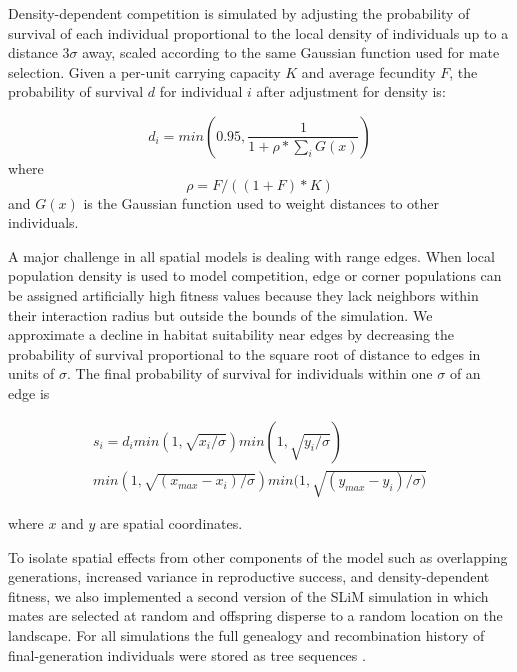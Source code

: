 \documentclass[9pt,twocolumn,twoside,lineno]{gsajnl}
\begin{document}
Density-dependent competition is simulated by adjusting the probability of survival of each individual proportional to the local density of individuals up to a distance $3\sigma$ away, scaled according to the same Gaussian function used for mate selection. Given a per-unit carrying capacity $K$ and average fecundity $F$, the probability of survival $d$ for individual $i$ after adjustment for density is:

\begin{equation}
    d_{i}=min(0.95,\frac{1}{1+\rho*\sum_{i}{G(x)}})
\end{equation}
where 
\begin{equation}
    \rho = F/((1+F)*K)
\end{equation} 
and $G(x)$ is the Gaussian function used to weight distances to other individuals. 

A major challenge in all spatial models is dealing with range edges. When local population density is used to model competition, edge or corner populations can be assigned artificially high fitness values because they lack neighbors within their interaction radius but outside the bounds of the simulation. We approximate a decline in habitat suitability near edges by decreasing the probability of survival proportional to the square root of distance to edges in units of $\sigma$. The final probability of survival for individuals within one $\sigma$ of an edge is 

\begin{multline}
    s_{i}=d_{i} min(1,\sqrt{x_{i}/\sigma})
    min(1,\sqrt{y_{i}/\sigma})\\
    min(1,\sqrt{(x_{max}-x_{i})/\sigma})
    min(1,\sqrt{(y_{max}-y_{i})/\sigma)}
\end{multline}

where $x$ and $y$ are spatial coordinates. 

To isolate spatial effects from other components of the model such as overlapping generations, increased variance in reproductive success, and density-dependent fitness, we  also implemented a second version of the SLiM simulation in which mates are selected at random and offspring disperse to a random location on the landscape. For all simulations the full genealogy and recombination history of final-generation individuals were stored as tree sequences \citep{Kelleher2018}. 
\end{document}
